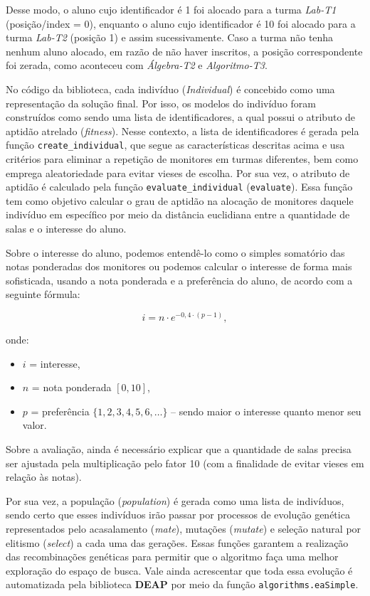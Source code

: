 \documentclass[a4paper,12pt]{article}
\begin{document}
Desse modo, o aluno cujo identificador é 1 foi alocado para a turma \textit{Lab-T1} (posição/index = 0), enquanto o aluno cujo identificador é 10 foi alocado para a turma \textit{Lab-T2} (posição 1) e assim sucessivamente. Caso a turma não tenha nenhum aluno alocado, em razão de não haver inscritos, a posição correspondente foi zerada, como aconteceu com \textit{Álgebra-T2} e \textit{Algoritmo-T3}.

No código da biblioteca, cada indivíduo (\textit{Individual}) é concebido como uma representação da solução final. Por isso, os modelos do indivíduo foram construídos como sendo uma lista de identificadores, a qual possui o atributo de aptidão atrelado (\textit{fitness}). Nesse contexto, a lista de identificadores é gerada pela função \texttt{create\_individual}, que segue as características descritas acima e usa critérios para eliminar a repetição de monitores em turmas diferentes, bem como emprega aleatoriedade para evitar vieses de escolha. Por sua vez, o atributo de aptidão é calculado pela função \texttt{evaluate\_individual} (\texttt{evaluate}). Essa função tem como objetivo calcular o grau de aptidão na alocação de monitores daquele indivíduo em específico por meio da distância euclidiana entre a quantidade de salas e o interesse do aluno.

Sobre o interesse do aluno, podemos entendê-lo como o simples somatório das notas ponderadas dos monitores ou podemos calcular o interesse de forma mais sofisticada, usando a nota ponderada e a preferência do aluno, de acordo com a seguinte fórmula:

\[
i = n \cdot e^{-0{,}4 \cdot (p - 1)},
\]

onde:
\begin{itemize}
    \item $i$ = interesse,
    \item $n$ = nota ponderada \quad $[0,10]$,
    \item $p$ = preferência \quad $\{1,2,3,4,5,6,\dots\}$ -- sendo maior o interesse quanto menor seu valor.
\end{itemize}

Sobre a avaliação, ainda é necessário explicar que a quantidade de salas precisa ser ajustada pela multiplicação pelo fator 10 (com a finalidade de evitar vieses em relação às notas).

Por sua vez, a população (\textit{population}) é gerada como uma lista de indivíduos, sendo certo que esses indivíduos irão passar por processos de evolução genética representados pelo acasalamento (\textit{mate}), mutações (\textit{mutate}) e seleção natural por elitismo (\textit{select}) a cada uma das gerações. Essas funções garantem a realização das recombinações genéticas para permitir que o algoritmo faça uma melhor exploração do espaço de busca. Vale ainda acrescentar que toda essa evolução é automatizada pela biblioteca \textbf{DEAP} por meio da função \texttt{algorithms.eaSimple}.
\end{document}
